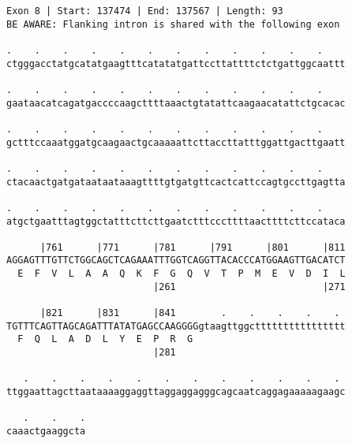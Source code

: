 \documentclass{article}
\begin{document}
\newpage
\begin{Verbatim}
Exon 8 | Start: 137474 | End: 137567 | Length: 93
BE AWARE: Flanking intron is shared with the following exon
 
.    .    .    .    .    .    .    .    .    .    .    .    
ctgggacctatgcatatgaagtttcatatatgattccttattttctctgattggcaattt
  
.    .    .    .    .    .    .    .    .    .    .    .    
gaataacatcagatgaccccaagcttttaaactgtatattcaagaacatattctgcacac
  
.    .    .    .    .    .    .    .    .    .    .    .    
gctttccaaatggatgcaagaactgcaaaaattcttaccttatttggattgacttgaatt
  
.    .    .    .    .    .    .    .    .    .    .    .    
ctacaactgatgataataataaagttttgtgatgttcactcattccagtgccttgagtta
  
.    .    .    .    .    .    .    .    .    .    .    .    
atgctgaatttagtggctatttcttcttgaatctttcccttttaacttttcttccataca
  
      |761      |771      |781      |791      |801      |811
AGGAGTTTGTTCTGGCAGCTCAGAAATTTGGTCAGGTTACACCCATGGAAGTTGACATCT
  E  F  V  L  A  A  Q  K  F  G  Q  V  T  P  M  E  V  D  I  L
                          |261                          |271
  
      |821      |831      |841        .    .    .    .    . 
TGTTTCAGTTAGCAGATTTATATGAGCCAAGGGGgtaagttggctttttttttttttttt
  F  Q  L  A  D  L  Y  E  P  R  G                           
                          |281                              
  
   .    .    .    .    .    .    .    .    .    .    .    . 
ttggaattagcttaataaaaggaggttaggaggagggcagcaatcaggagaaaaagaagc
  
   .    .    .
caaactgaaggcta
\end{Verbatim}
\newpage
\end{document}
